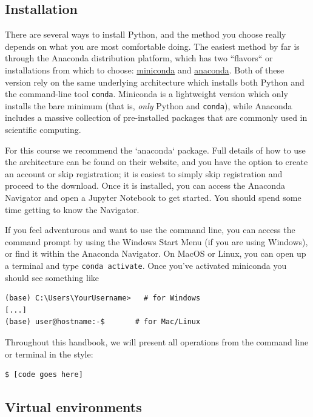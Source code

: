 \documentclass{tufte-book}
\begin{document}
\subsection{Installation}\label{subsec:python-install}

{There are several ways} to install Python, and the method you choose really depends on what you are most comfortable doing. The easiest method by far is through the Anaconda distribution platform, which has two ``flavors`` or installations from which to choose: \href{http://conda.pydata.org/miniconda.html}{miniconda} and \href{https://www.anaconda.com/download}{anaconda}. Both of these version rely on the same underlying architecture which installs both Python and the command-line tool \verb|conda|. Miniconda is a lightweight version which only installs the bare minimum (that is, \textit{only} Python and \verb|conda|), while Anaconda includes a massive collection of pre-installed packages that are commonly used in scientific computing. 

For this course we recommend the `anaconda` package. Full details of how to use the architecture can be found on their website, and you have the option to create an account or skip registration; it is easiest to simply skip registration and proceed to the download. Once it is installed, you can access the Anaconda Navigator and open a Jupyter Notebook to get started. You should spend some time getting to know the Navigator. 

If you feel adventurous and want to use the command line, you can access the command prompt by using the Windows Start Menu (if you are using Windows), or find it within the Anaconda Navigator. On MacOS or Linux, you can open up a terminal and type \verb|conda activate|. Once you've activated miniconda you should see something like

\begin{lstlisting}[backgroundcolor=\color{lightgray}]
(base) C:\Users\YourUsername>   # for Windows
[...]
(base) user@hostname:-$       # for Mac/Linux
\end{lstlisting}


Throughout this handbook, we will present all operations from the command line or terminal in the style:
\begin{lstlisting}[backgroundcolor=\color{lightgray}]
$ [code goes here]
\end{lstlisting}

\subsection{Virtual environments}\label{subsec:python-venv}
\end{document}
